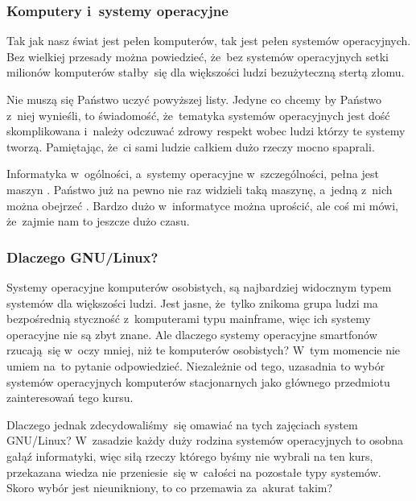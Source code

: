 \documentclass[10pt,t]{beamer}
\begin{document}
\begin{frame}
  \frametitle{Komputery i~systemy operacyjne}


  Tak jak nasz świat jest pełen komputerów, tak jest pełen systemów
  operacyjnych. Bez wielkiej przesady można powiedzieć, że~bez systemów
  operacyjnych setki milionów komputerów stałby~się dla większości ludzi
  bezużyteczną stertą złomu.

  \alert{Nie} muszą się Państwo uczyć powyższej listy. Jedyne co chcemy by
  Państwo z~niej wynieśli, to świadomość, że~tematyka systemów operacyjnych
  jest dość skomplikowana i~należy odczuwać zdrowy respekt wobec
  ludzi którzy te systemy tworzą. Pamiętając, że~ci sami ludzie
  całkiem dużo rzeczy mocno spaprali.

  Informatyka w~ogólności, a~systemy operacyjne w~szczególności, pełna jest
  maszyn
  . Państwo już na pewno nie raz
  widzieli taką maszynę, a~jedną z~nich można obejrzeć
  .
  Bardzo dużo w~informatyce można uprościć, ale coś mi mówi, że~zajmie nam
  to jeszcze dużo czasu.

\end{frame}





\begin{frame}
  \frametitle{Dlaczego GNU/Linux?}


  Systemy operacyjne komputerów osobistych, są najbardziej widocznym typem
  systemów dla większości ludzi. Jest jasne, że~tylko znikoma grupa ludzi
  ma bezpośrednią styczność z~komputerami typu mainframe, więc ich systemy
  operacyjne nie są zbyt znane. Ale dlaczego systemy operacyjne smartfonów
  rzucają~się w~oczy mniej, niż te komputerów osobistych? W~tym momencie
  nie umiem na~to pytanie odpowiedzieć. Niezależnie od tego, uzasadnia to
  wybór systemów operacyjnych komputerów stacjonarnych jako głównego
  przedmiotu zainteresowań tego kursu.

  Dlaczego jednak zdecydowaliśmy~się omawiać na tych zajęciach system
  GNU/Linux? W~zasadzie każdy duży rodzina systemów operacyjnych to osobna
  gałąź informatyki, więc siłą rzeczy którego byśmy nie wybrali na ten kurs,
  przekazana wiedza nie przeniesie~się w~całości na pozostałe typy systemów.
  Skoro wybór jest nieunikniony, to co przemawia za~akurat takim?

\end{frame}
\end{document}
